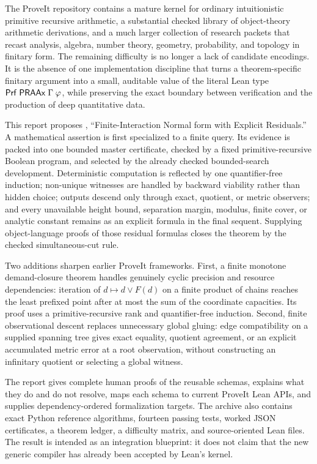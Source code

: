 The ProveIt repository contains a mature kernel for ordinary intuitionistic primitive recursive arithmetic, a substantial checked library of object-theory arithmetic derivations, and a much larger collection of research packets that recast analysis, algebra, number theory, geometry, probability, and topology in finitary form.  The remaining difficulty is no longer a lack of candidate encodings.  It is the absence of one implementation discipline that turns a theorem-specific finitary argument into a small, auditable value of the literal Lean type \(\mathsf{Prf}\;\mathsf{PRAAx}\;\Gamma\;\varphi\), while preserving the exact boundary between verification and the production of deep quantitative data.

This report proposes \FINER, ``Finite-Interaction Normal form with Explicit Residuals.''  A mathematical assertion is first specialized to a finite query.  Its evidence is packed into one bounded master certificate, checked by a fixed primitive-recursive Boolean program, and selected by the already checked bounded-search development.  Deterministic computation is reflected by one quantifier-free induction; non-unique witnesses are handled by backward viability rather than hidden choice; outputs descend only through exact, quotient, or metric observers; and every unavailable height bound, separation margin, modulus, finite cover, or analytic constant remains as an explicit formula in the final sequent.  Supplying object-language proofs of those residual formulas closes the theorem by the checked simultaneous-cut rule.

Two additions sharpen earlier ProveIt frameworks.  First, a finite monotone demand-closure theorem handles genuinely cyclic precision and resource dependencies: iteration of \(d\mapsto d\vee F(d)\) on a finite product of chains reaches the least prefixed point after at most the sum of the coordinate capacities.  Its proof uses a primitive-recursive rank and quantifier-free induction.  Second, finite observational descent replaces unnecessary global gluing: edge compatibility on a supplied spanning tree gives exact equality, quotient agreement, or an explicit accumulated metric error at a root observation, without constructing an infinitary quotient or selecting a global witness.

The report gives complete human proofs of the reusable schemas, explains what they do and do not resolve, maps each schema to current ProveIt Lean APIs, and supplies dependency-ordered formalization targets.  The archive also contains exact Python reference algorithms, fourteen passing tests, worked JSON certificates, a theorem ledger, a difficulty matrix, and source-oriented Lean files.  The result is intended as an integration blueprint: it does not claim that the new generic compiler has already been accepted by Lean's kernel.
